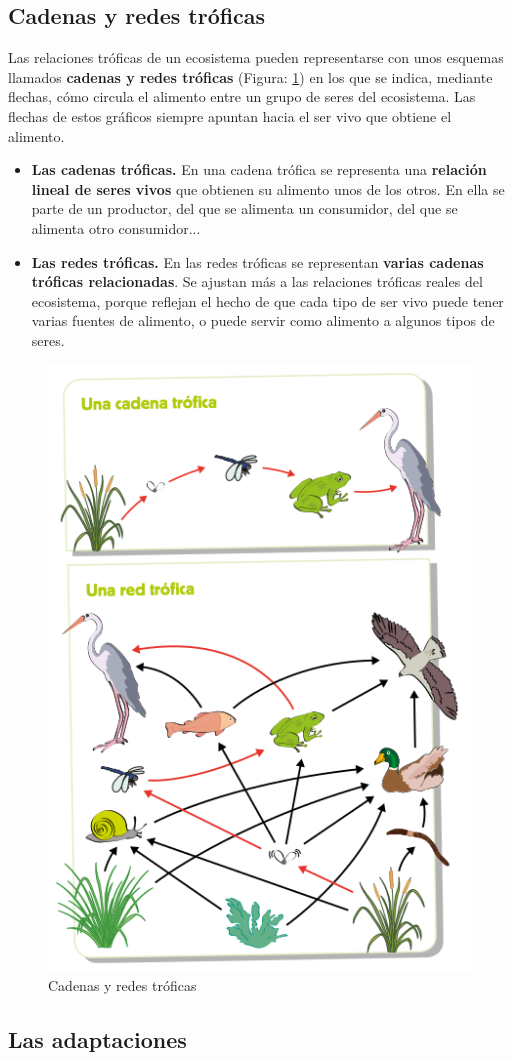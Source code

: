 \subsection{Cadenas y redes tróficas}

Las relaciones tróficas de un ecosistema pueden representarse con unos esquemas llamados \textbf{cadenas y redes tróficas} (Figura: \ref{fig:cadenas-redes-troficas}) en los que se indica, mediante flechas, cómo circula el alimento entre un grupo de seres del ecosistema. Las flechas de estos gráficos siempre apuntan hacia el ser vivo que obtiene el alimento.
\begin{itemize}
    \item \textbf{Las cadenas tróficas.} En una cadena trófica se representa una \textbf{relación lineal de seres vivos} que obtienen su alimento unos de los otros. En ella se parte de un productor, del que se alimenta un consumidor, del que se alimenta otro consumidor...
    \item \textbf{Las redes tróficas.} En las redes tróficas se representan \textbf{varias cadenas tróficas relacionadas}. Se ajustan más a las relaciones tróficas reales del ecosistema, porque reflejan el hecho de que cada tipo de ser vivo puede tener varias fuentes de alimento, o puede servir como alimento a algunos tipos de seres.
\end{itemize}

\begin{figure}[!ht]
    \centering
    \includegraphics[width=0.4\linewidth]{Tema1/22_Cadenas_Redes_Troficas.png}
    \caption{Cadenas y redes tróficas}
    \label{fig:cadenas-redes-troficas}
\end{figure}

\subsection{Las adaptaciones}

